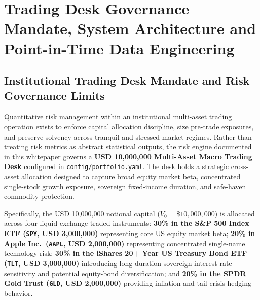 \documentclass[11pt,a4paper]{article}
\begin{document}
\begin{abstract}
\end{abstract}

\tableofcontents
\newpage

\section{Trading Desk Governance Mandate, System Architecture and Point-in-Time Data Engineering}

\subsection{Institutional Trading Desk Mandate and Risk Governance Limits}

Quantitative risk management within an institutional multi-asset trading operation exists to enforce capital allocation discipline, size pre-trade exposures, and preserve solvency across tranquil and stressed market regimes. Rather than treating risk metrics as abstract statistical outputs, the risk engine documented in this whitepaper governs a \textbf{USD 10,000,000 Multi-Asset Macro Trading Desk} configured in \texttt{config/portfolio.yaml}. The desk holds a strategic cross-asset allocation designed to capture broad equity market beta, concentrated single-stock growth exposure, sovereign fixed-income duration, and safe-haven commodity protection.

Specifically, the USD 10,000,000 notional capital ($V_0 = \$10,000,000$) is allocated across four liquid exchange-traded instruments: \textbf{30\% in the S\&P 500 Index ETF (\texttt{SPY}, USD 3,000,000)} representing core US equity market beta; \textbf{20\% in Apple Inc.\ (\texttt{AAPL}, USD 2,000,000)} representing concentrated single-name technology risk; \textbf{30\% in the iShares 20+ Year US Treasury Bond ETF (\texttt{TLT}, USD 3,000,000)} introducing long-duration sovereign interest-rate sensitivity and potential equity-bond diversification; and \textbf{20\% in the SPDR Gold Trust (\texttt{GLD}, USD 2,000,000)} providing inflation and tail-crisis hedging behavior.
\end{document}

